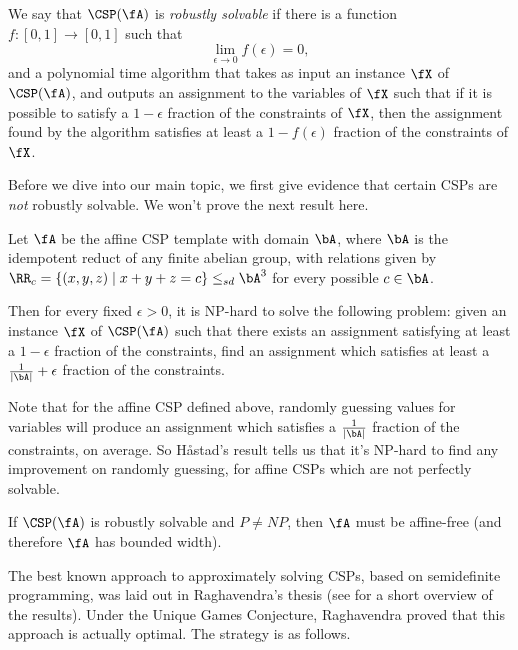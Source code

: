 \begin{defn} We say that $\CSP(\fA)$ is \emph{robustly solvable} if there is a function $f : [0,1] \rightarrow [0,1]$ such that
\[
\lim_{\epsilon \rightarrow 0} f(\epsilon) = 0,
\]
and a polynomial time algorithm that takes as input an instance $\fX$ of $\CSP(\fA)$, and outputs an assignment to the variables of $\fX$ such that if it is possible to satisfy a $1-\epsilon$ fraction of the constraints of $\fX$, then the assignment found by the algorithm satisfies at least a $1-f(\epsilon)$ fraction of the constraints of $\fX$.
\end{defn}

Before we dive into our main topic, we first give evidence that certain CSPs are \emph{not} robustly solvable. We won't prove the next result here.

\begin{thm} Let $\fA$ be the affine CSP template with domain $\bA$, where $\bA$ is the idempotent reduct of any finite abelian group, with relations given by $\RR_c = \{(x,y,z) \mid x+y+z = c\} \le_{sd} \bA^3$ for every possible $c \in \bA$.

Then for every fixed $\epsilon > 0$, it is NP-hard to solve the following problem: given an instance $\fX$ of $\CSP(\fA)$ such that there exists an assignment satisfying at least a $1-\epsilon$ fraction of the constraints, find an assignment which satisfies at least a $\frac{1}{|\bA|} + \epsilon$ fraction of the constraints.
\end{thm}

Note that for the affine CSP defined above, randomly guessing values for variables will produce an assignment which satisfies a $\frac{1}{|\bA|}$ fraction of the constraints, on average. So H\r{a}stad's result tells us that it's NP-hard to find any improvement on randomly guessing, for affine CSPs which are not perfectly solvable.

\begin{cor} If $\CSP(\fA)$ is robustly solvable and $P \ne NP$, then $\fA$ must be affine-free (and therefore $\fA$ has bounded width).
\end{cor}

The best known approach to approximately solving CSPs, based on semidefinite programming, was laid out in Raghavendra's thesis \cite{raghavendra-thesis} (see \cite{raghavendra-optimal} for a short overview of the results). Under the Unique Games Conjecture, Raghavendra proved that this approach is actually optimal. The strategy is as follows.

